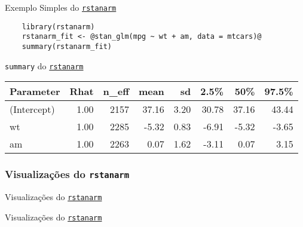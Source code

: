 \begin{frame}[fragile]{Exemplo Simples do \href{http://mc-stan.org/rstanarm/}{\texttt{rstanarm}}}
    \begin{lstlisting}
    library(rstanarm)
    rstanarm_fit <- @stan_glm(mpg ~ wt + am, data = mtcars)@
    summary(rstanarm_fit)
    \end{lstlisting}
\end{frame}

\begin{frame}{\texttt{summary} do \href{http://mc-stan.org/rstanarm/}{\texttt{rstanarm}}}
    \centering
    \begin{tabular}{lrrrrrrr}
    \toprule
    Parameter & Rhat & n\_eff & mean & sd & 2.5\% & 50\% & 97.5\% \\
    \midrule
    (Intercept) & 1.00 & 2157 & 37.16 & 3.20 & 30.78 & 37.16 & 43.44 \\
    wt & 1.00 & 2285 & -5.32 & 0.83 & -6.91 & -5.32 & -3.65 \\
    am & 1.00 & 2263 & 0.07 & 1.62 & -3.11 & 0.07 & 3.15 \\
    \bottomrule
    \end{tabular}
\end{frame}

\subsubsection{Visualizações do \texttt{rstanarm}}
\begin{frame}{Visualizações do \href{http://mc-stan.org/rstanarm/}{\texttt{rstanarm}}}
    \centering
    \begin{figure}
        \resizebox{.45\linewidth}{!}{}
    \end{figure}
\end{frame}

\begin{frame}{Visualizações do \href{http://mc-stan.org/rstanarm/}{\texttt{rstanarm}}}
    \centering
    \begin{figure}
        \resizebox{.45\linewidth}{!}{}
    \end{figure}
\end{frame}

